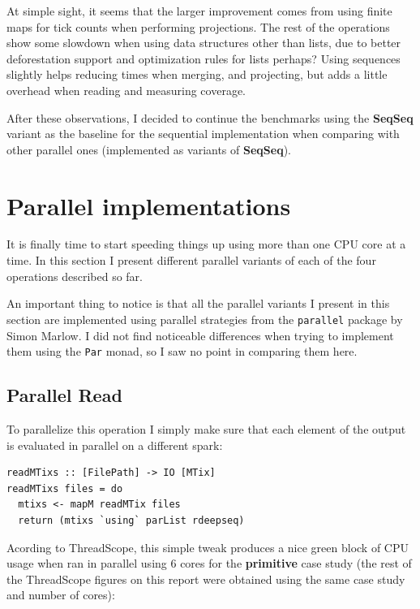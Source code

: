 \documentclass[a4paper,10pt]{article}
\begin{document}
At simple sight, it seems that the larger improvement comes from using finite
maps for tick counts when performing projections.
%
The rest of the operations show some slowdown when using data structures other
than lists, due to better deforestation support and optimization rules for lists
perhaps?
%
Using sequences slightly helps reducing times when merging, and projecting, but
adds a little overhead when reading and measuring coverage.

After these observations, I decided to continue the benchmarks using the
\textbf{SeqSeq} variant as the baseline for the sequential implementation when
comparing with other parallel ones (implemented as variants of \textbf{SeqSeq}).


\section*{Parallel implementations}

It is finally time to start speeding things up using more than one CPU core at a
time.
%
In this section I present different parallel variants of each of the four
operations described so far.

An important thing to notice is that all the parallel variants I present in this
section are implemented using parallel strategies from the \texttt{parallel}
package \cite{seq-no-more} by Simon Marlow.
%
I did not find noticeable differences when trying to implement them using the
\texttt{Par} monad, so I saw no point in comparing them here.


\subsection*{Parallel Read}

To parallelize this operation I simply make sure that each element of the output
is evaluated in parallel on a different spark:

\begin{verbatim}
readMTixs :: [FilePath] -> IO [MTix]
readMTixs files = do
  mtixs <- mapM readMTix files
  return (mtixs `using` parList rdeepseq)
\end{verbatim}

Acording to ThreadScope, this simple tweak produces a nice green block of CPU
usage when ran in parallel using 6 cores for the \textbf{primitive} case study
(the rest of the ThreadScope figures on this report were obtained using the same
case study and number of cores):\\
\end{document}
